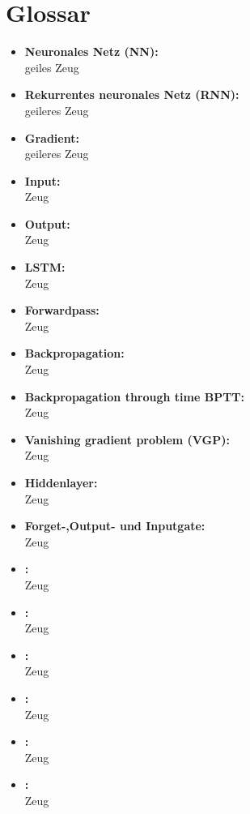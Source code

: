\chapter{Glossar} 
\label{ch:glossar}
	\begin{itemize}
		\item \textbf{Neuronales Netz (NN):}\\
		geiles Zeug
		\item \textbf{Rekurrentes neuronales Netz (RNN):}\\
		geileres Zeug
		\item \textbf{Gradient:}\\
		geileres Zeug
		\item \textbf{Input:}\\
		Zeug
		\item \textbf{Output:}\\
		Zeug
		\item \textbf{LSTM:}\\
		Zeug
		\item \textbf{Forwardpass:}\\
		Zeug
		\item \textbf{Backpropagation:}\\
		Zeug
		\item \textbf{Backpropagation through time BPTT:}\\
		Zeug
		\item \textbf{Vanishing gradient problem (VGP):}\\
		Zeug
		\item \textbf{Hiddenlayer:}\\
		Zeug
		\item \textbf{Forget-,Output- und Inputgate:}\\
		Zeug
		\item \textbf{:}\\
		Zeug
		\item \textbf{:}\\
		Zeug
		\item \textbf{:}\\
		Zeug
		\item \textbf{:}\\
		Zeug
		\item \textbf{:}\\
		Zeug
		\item \textbf{:}\\
		Zeug
		
		
		
	
	\end{itemize}